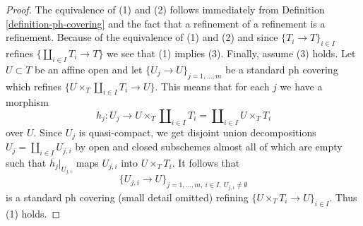 \documentclass[10pt,a4paper]{amsart}
\theoremstyle{plain}
\theoremstyle{definition}
\theoremstyle{remark}
\numberwithin{equation}{subsection}
\begin{document}
\begin{proof}
The equivalence of (1) and (2) follows immediately from
Definition \ref{definition-ph-covering}
and the fact that a refinement of a refinement is a refinement.
Because of the equivalence of (1) and (2) and since
$\{T_i \to T\}_{i \in I}$ refines $\{\coprod_{i \in I} T_i \to T\}$
we see that (1) implies (3). Finally, assume (3) holds.
Let $U \subset T$ be an affine open and let
$\{U_j \to U\}_{j = 1, \ldots, m}$ be a standard ph covering
which refines $\{U \times_T \coprod_{i \in I} T_i \to U\}$.
This means that for each $j$ we have a morphism
$$
h_j :
U_j
\longrightarrow
U \times_T \coprod\nolimits_{i \in I} T_i =
\coprod\nolimits_{i \in I} U \times_T T_i
$$
over $U$. Since $U_j$ is quasi-compact, we get
disjoint union decompositions $U_j = \coprod_{i \in I} U_{j, i}$
by open and closed subschemes almost all of which are empty
such that $h_j|_{U_{j, i}}$ maps $U_{j, i}$ into $U \times_T T_i$.
It follows that
$$
\{U_{j, i} \to U\}_{j = 1, \ldots, m,\ i \in I,\ U_{j, i} \not = \emptyset}
$$
is a standard ph covering (small detail omitted) refining
$\{U \times_T T_i \to U\}_{i \in I}$. Thus (1) holds.
\end{proof}
\end{document}
